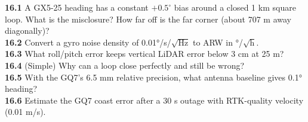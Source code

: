 \begin{tryit}
\textbf{16.1} A GX5-25 heading has a constant $+0.5^\circ$ bias around a closed 1 km square loop. What is the misclosure? How far off is the far corner (about 707 m away diagonally)?\\
\textbf{16.2} Convert a gyro noise density of 0.01°/s/$\sqrt{\text{Hz}}$ to ARW in °/$\sqrt{\text{h}}$.\\
\textbf{16.3} What roll/pitch error keeps vertical LiDAR error below 3 cm at 25 m?\\
\textbf{16.4} (Simple) Why can a loop close perfectly and still be wrong?\\
\textbf{16.5} With the GQ7's 6.5 mm relative precision, what antenna baseline gives 0.1° heading?\\
\textbf{16.6} Estimate the GQ7 coast error after a 30 s outage with RTK-quality velocity (0.01 m/s).
\end{tryit}

